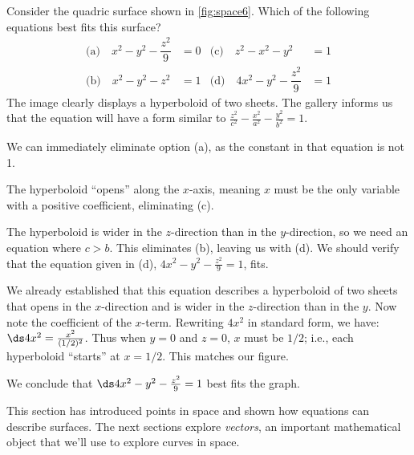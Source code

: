 \begin{example}\label{ex_space6}
Consider the quadric surface shown in \autoref{fig:space6}. Which of the following equations best fits this surface?
\begin{align*}
\text{(a)}\quad x^2-y^2-\dfrac{z^2}{9}&=0 & \text{(c)}\quad z^2-x^2-y^2&=1 \\
\text{(b)}\quad x^2-y^2-z^2&=1 & \text{(d)}\quad 4x^2-y^2-\dfrac{z^2}9&=1
\end{align*}
\solution
The image clearly displays a hyperboloid of two sheets. The gallery informs us that the equation will have a form similar to $\frac{z^2}{c^2}-\frac{x^2}{a^2}-\frac{y^2}{b^2}=1$. 

We can immediately eliminate option (a), as the constant in that equation is not 1.


The hyperboloid ``opens'' along the $x$-axis, meaning $x$ must be the only variable with a  positive coefficient, eliminating (c).

The hyperboloid is wider in the $z$-direction than in the $y$-direction, so we need an equation where $c>b$. This eliminates (b), leaving us with (d). We should verify that the equation given in (d), $4x^2-y^2-\frac{z^2}9=1$, fits.

We already established that this equation describes a hyperboloid of two sheets that opens in the $x$-direction and is wider in the $z$-direction than in the $y$. Now note the coefficient of the $x$-term. Rewriting $4x^2$ in standard form, we have: $\ds 4x^2 = \frac{x^2}{(1/2)^2}$. Thus when $y=0$ and $z=0$, $x$ must be $1/2$; i.e., each hyperboloid ``starts'' at $x=1/2$. This matches our figure.

We conclude that $\ds 4x^2-y^2-\frac{z^2}9=1$ best fits the graph.
\end{example}

This section has introduced points in space and shown how equations can describe surfaces. The next sections explore \emph{vectors}, an important mathematical object that we'll use to explore curves in space.


